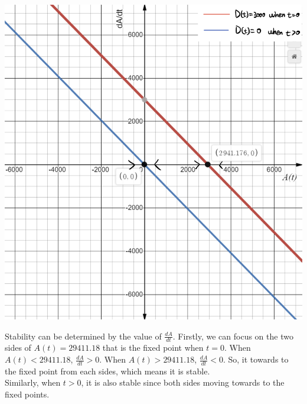 \documentclass{article}
\begin{document}
\begin{center}

  
      \includegraphics[scale = 0.15]{oralStab.jpg}


\end{center}
        
        



Stability can be determined by the value of $\frac{dA}{dt}$. Firstly, we can focus on the two sides of $A(t) = 29411.18$ that is the fixed point when $t = 0$. When $A(t) < 29411.18$, $\frac{dA}{dt} > 0$. When $A(t) > 29411.18$, $\frac{dA}{dt} < 0$. So, it towards to the fixed point from each sides, which means it is stable. \\
Similarly, when $t>0$, it is also stable since both sides moving towards to the fixed points.
\end{document}
